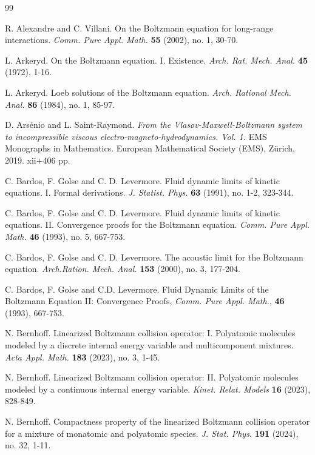 \documentclass[reqno,11pt]{amsart}
\numberwithin{equation}{section}
\begin{document}
%
%
\begin{thebibliography}{99}




 R. Alexandre and C. Villani. On the Boltzmann equation for long-range interactions. {\em Comm. Pure Appl. Math.} {\bf 55} (2002), no. 1, 30-70.

 L. Arkeryd. On the Boltzmann equation. I. Existence. {\em Arch. Rat. Mech. Anal.} {\bf 45} (1972), 1-16.

 L. Arkeryd. Loeb solutions of the Boltzmann equation. {\em Arch. Rational Mech. Anal.} {\bf 86} (1984), no. 1, 85-97. 
    
 D. Ars\'enio and L. Saint-Raymond. {\em From the Vlasov-Maxwell-Boltzmann system to incompressible viscous electro-magneto-hydrodynamics. Vol. 1.} { EMS Monographs in Mathematics. European Mathematical Society (EMS)}, Z\"urich, 2019. xii+406 pp.
    
 C. Bardos, F. Golse and C. D. Levermore. Fluid dynamic limits of kinetic equations. I. Formal derivations. {\em J. Statist. Phys.} {\bf 63} (1991), no. 1-2, 323-344.
    
 C. Bardos, F. Golse and C. D. Levermore. Fluid dynamic limits of kinetic equations. II. Convergence proofs for the Boltzmann equation. {\em Comm. Pure Appl. Math.} {\bf 46} (1993), no. 5, 667-753.
    
 C. Bardos, F. Golse and C. D. Levermore. The acoustic limit for the Boltzmann equation. {\em Arch.Ration. Mech. Anal.} {\bf 153} (2000), no. 3, 177-204. 
    
 C. Bardos, F. Golse and C.D. Levermore. Fluid Dynamic Limits of the Boltzmann Equation II: Convergence Proofs, {\em Comm. Pure Appl. Math.}, {\bf 46} (1993), 667-753.

 N. Bernhoff. Linearized Boltzmann collision operator: I. Polyatomic molecules modeled by a discrete internal energy variable and multicomponent mixtures. {\em Acta Appl. Math.} {\bf 183} (2023), no. 3, 1-45.

 N. Bernhoff. Linearized Boltzmann collision operator: II. Polyatomic molecules modeled by a continuous internal energy variable. {\em Kinet. Relat. Models} {\bf 16} (2023), 828-849.

 N. Bernhoff. Compactness property of the linearized Boltzmann collision operator for a mixture of monatomic and polyatomic species. {\em J. Stat. Phys.} {\bf 191} (2024), no. 32, 1-11.
	

\end{thebibliography}
\end{document}
